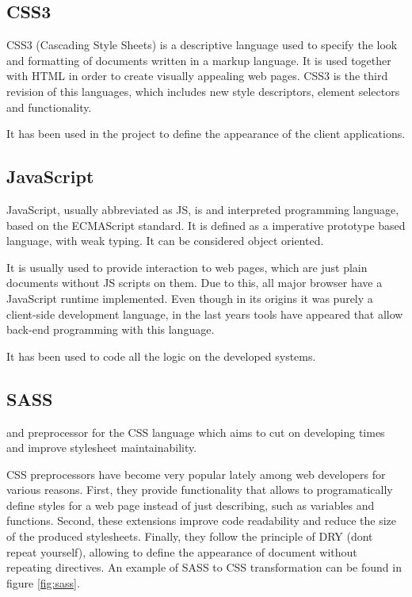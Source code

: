 \subsection*{CSS3}

CSS3 (Cascading Style Sheets) is a descriptive language used to specify the look and formatting of documents written in a markup language. It is used together with HTML in order to create visually appealing web pages. CSS3 is the third revision of this languages, which includes new style descriptors, element selectors and functionality.

It has been used in the project to define the appearance of the client applications.

\subsection*{JavaScript}

JavaScript, usually abbreviated as JS, is and interpreted programming language, based on the ECMAScript standard. It is defined as a imperative prototype based language, with weak typing. It can be considered object oriented.

It is usually used to provide interaction to web pages, which are just plain documents without JS scripts on them. Due to this, all major browser have a JavaScript runtime implemented. Even though in its origins it was purely a client-side development language, in the last years tools have appeared that allow back-end programming with this language.

It has been used to code all the logic on the developed systems.

\subsection*{SASS}

 and preprocessor for the CSS language which aims to cut on developing times and improve stylesheet maintainability. 

CSS preprocessors have become very popular lately among web developers for various reasons. First, they provide functionality that allows to programatically define styles for a web page instead of just describing, such as variables and functions. Second, these extensions improve code readability and reduce the size of the produced stylesheets. Finally, they follow the principle of DRY (dont repeat yourself), allowing to define the appearance of document without repeating directives. An example of SASS to CSS transformation can be found in figure \ref{fig:sass}.

